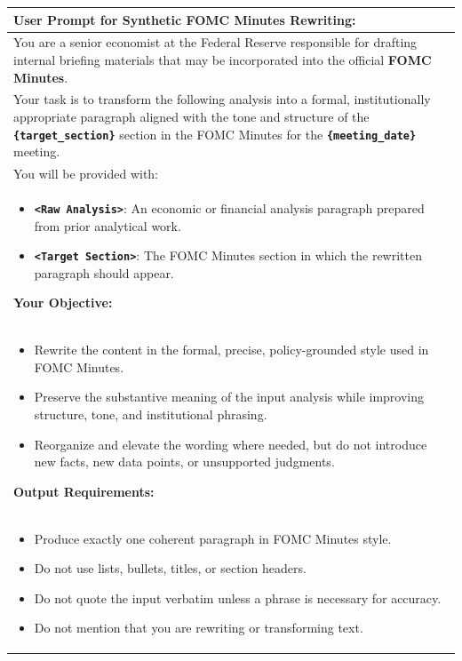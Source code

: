 \begin{table}[h]
    \centering
    \footnotesize
    \begin{tabular}{p{}}
    \toprule
    \textbf{User Prompt for Synthetic FOMC Minutes Rewriting:} \\
    \midrule
    You are a senior economist at the Federal Reserve responsible for drafting internal briefing materials that may be incorporated into the official \textbf{FOMC Minutes}. \\

    Your task is to transform the following analysis into a formal, institutionally appropriate paragraph aligned with the tone and structure of the \textbf{\texttt{\{target\_section\}}} section in the FOMC Minutes for the \textbf{\texttt{\{meeting\_date\}}} meeting. \\

    You will be provided with: \\
    \begin{itemize}
        \item \textbf{\texttt{<Raw Analysis>}}: An economic or financial analysis paragraph prepared from prior analytical work.
        \item \textbf{\texttt{<Target Section>}}: The FOMC Minutes section in which the rewritten paragraph should appear.
    \end{itemize}

    \textbf{Your Objective:} \\
    \begin{itemize}
        \item Rewrite the content in the formal, precise, policy-grounded style used in FOMC Minutes.
        \item Preserve the substantive meaning of the input analysis while improving structure, tone, and institutional phrasing.
        \item Reorganize and elevate the wording where needed, but do not introduce new facts, new data points, or unsupported judgments.
    \end{itemize}

    \textbf{Output Requirements:} \\
    \begin{itemize}
        \item Produce exactly one coherent paragraph in FOMC Minutes style.
        \item Do not use lists, bullets, titles, or section headers.
        \item Do not quote the input verbatim unless a phrase is necessary for accuracy.
        \item Do not mention that you are rewriting or transforming text.
    \end{itemize}


\end{tabular}
\end{table}
